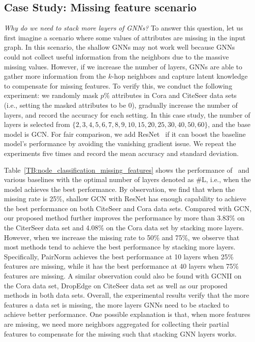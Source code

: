 \subsection{Case Study: Missing feature scenario}
\label{Missing_feature_scenario}
\emph{Why do we need to stack more layers of GNNs?} To answer this question, let us first imagine a scenario where some values of attributes are missing in the input graph. In this scenario, the shallow GNNs may not work well because GNNs could not collect useful information from the neighbors due to the massive missing values. However, if we increase the number of layers, GNNs are able to gather more information from the $k$-hop neighbors and capture latent knowledge to compensate for missing features. To verify this, we conduct the following experiment: we randomly mask $p\%$ attributes in Cora and CiteSeer data sets (i.e., setting the masked attributes to be 0), gradually increase the number of layers, and record the accuracy for each setting. In this case study, the number of layers is selected from $\{2, 3, 4, 5, 6, 7, 8, 9, 10, 15, 20, 25, 30, 40, 50, 60\}$, and the base model is GCN. For fair comparison, we add ResNet~\citep{DBLP:conf/cvpr/HeZRS16} if it can boost the baseline model's performance by avoiding the vanishing gradient issue. We repeat the experiments five times and record the mean accuracy and standard deviation. 


Table~\ref{TB:node_classification_missing_features} shows the performance of \name\ and various baselines with the optimal number of layers denoted as \#L, i.e., when the model achieves the best performance. By observation, we find that when the missing rate is 25\%, shallow GCN with ResNet has enough capability to achieve the best performance on both CiteSeer and Cora data sets. Compared with GCN, our proposed method further improves the performance by more than 3.83\% on the CiterSeer data set and 4.08\% on the Cora data set by stacking more layers. However, when we increase the missing rate to 50\% and 75\%, we observe that most methods tend to achieve the best performance by stacking more layers. Specifically, PairNorm achieves the best performance at 10 layers when 25\% features are missing, while it has the best performance at 40 layers when 75\% features are missing. A similar observation could also be found with GCNII on the Cora data set, DropEdge on CiteSeer data set as well as our proposed methods in both data sets.
Overall, the experimental results verify that the more features a data set is missing, the more layers GNNs need to be stacked to achieve better performance.
One possible explanation is that, when more features are missing, we need more neighbors aggregated for collecting their partial features to compensate for the missing such that stacking GNN layers works.


